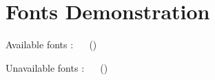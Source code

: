 \documentclass[
]{scrartcl}
\begin{document}
    \pagecolor{black!7.5}
    \section*{Fonts Demonstration}
    \singlespacing

    \noindent\textcolor{myColorSuccess!50!black}{Available fonts} :%
    \ %
    \ ()%

    \noindent\textcolor{myColorDanger!50!black}{Unavailable fonts} :%
    \ %
    \ ()%
\end{document}
